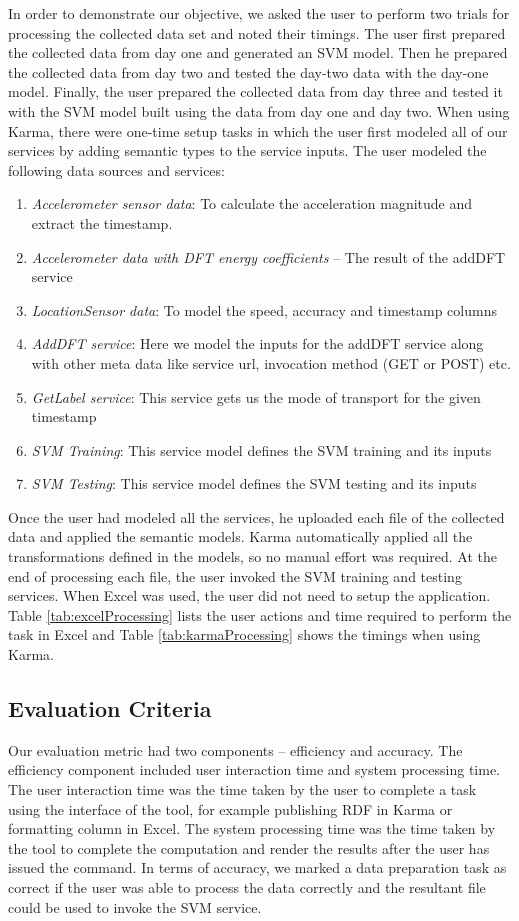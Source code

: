 In order to demonstrate our objective, we asked the user to perform two trials for processing the collected data set and noted their timings. The user first prepared the collected data from day one and generated an SVM model. Then he prepared the collected data from day two and tested the day-two data with the day-one model. Finally, the user prepared the collected data from day three and tested it with the SVM model built using the data from day one and day two. When using Karma, there were one-time setup tasks in which the user first modeled all of our services by adding semantic types to the service inputs. The user modeled the following data sources and services:
\begin{enumerate}
	\item \textit{Accelerometer sensor data}: To calculate the acceleration magnitude and extract the timestamp.
	\item \textit{Accelerometer data with DFT energy coefficients} – The result of the addDFT service 
	\item \textit{LocationSensor data}: To model the speed, accuracy and timestamp columns
	\item \textit{AddDFT service}: Here we model the inputs for the addDFT service along with other meta data like service url, invocation method (GET or POST) etc.
	\item \textit{GetLabel service}: This service gets us the mode of transport for the given timestamp
	\item \textit{SVM Training}: This service model defines the SVM training and its inputs
	\item \textit{SVM Testing}: This service model defines the SVM testing and its inputs
\end{enumerate} 

Once the user had modeled all the services, he uploaded each file of the collected data and applied the semantic models. Karma automatically applied all the transformations defined in the models, so no manual effort was required. At the end of processing each file, the user invoked the SVM training and testing services. When Excel was used, the user did not need to setup the application. Table \ref{tab:excelProcessing} lists the user actions and time required to perform the task in Excel and Table \ref{tab:karmaProcessing} shows the timings when using Karma.

\subsection{Evaluation Criteria}
Our evaluation metric had two components -- efficiency and accuracy. The efficiency component included user interaction time and system processing time. The user interaction time was the time taken by the user to complete a task using the interface of the tool, for example publishing RDF in Karma or formatting column in Excel. The system processing time was the time taken by the tool to complete the computation and render the results after the user has issued the command. In terms of accuracy, we marked a data preparation task as correct if the user was able to process the data correctly and the resultant file could be used to invoke the SVM service.

